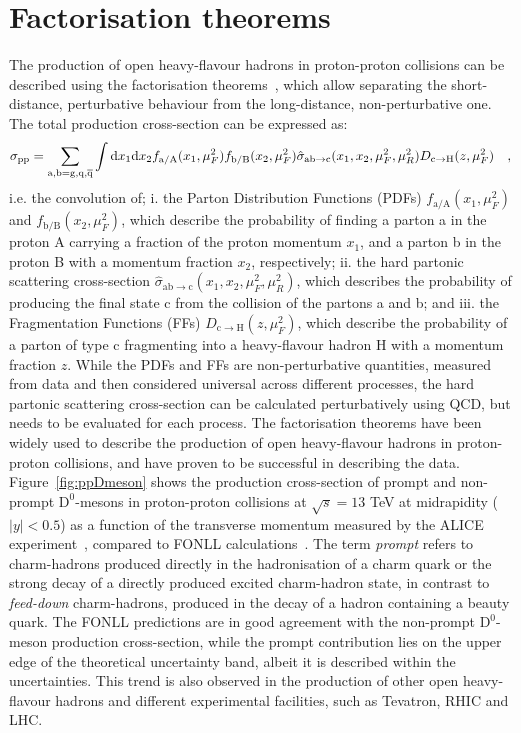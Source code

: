 \section{Factorisation theorems}
The production of open heavy-flavour hadrons in proton-proton collisions can be described using the factorisation theorems~\cite{Collins:1989gx}, which allow separating the short-distance, perturbative behaviour from the long-distance, non-perturbative one. The total production cross-section can be expressed as:
\begin{equation*}
    \sigma_{\text{pp}} = \sum_\mathrm{a,b = g, q, \overline{q}} \int \mathrm{d} x_1 \mathrm{d} x_2 f_\mathrm{a/A}(x_1,\mu_F^2) f_\mathrm{b/B}(x_2,\mu_F^2) \hat{\sigma}_\mathrm{ab \rightarrow c} (x_1,x_2,\mu_F^2,\mu_R^2) D_\mathrm{c\rightarrow H}(z,\mu_F^2) \quad ,
\end{equation*}
i.e. the convolution of; i. the Parton Distribution Functions (PDFs) $f_\mathrm{a/A}(x_1,\mu_F^2)$ and $f_\mathrm{b/B}(x_2,\mu_F^2)$, which describe the probability of finding a parton a in the proton A carrying a fraction of the proton momentum $x_1$, and a parton b in the proton B with a momentum fraction $x_2$, respectively; ii. the hard partonic scattering cross-section $\hat{\sigma}_\mathrm{ab \rightarrow c} (x_1,x_2,\mu_F^2,\mu_R^2)$, which describes the probability of producing the final state c from the collision of the partons a and b; and iii. the Fragmentation Functions (FFs) $D_\mathrm{c\rightarrow H}(z,\mu_F^2)$, which describe the probability of a parton of type c fragmenting into a heavy-flavour hadron H with a momentum fraction $z$. While the PDFs and FFs are non-perturbative quantities, measured from data and then considered universal across different processes, the hard partonic scattering cross-section can be calculated perturbatively using QCD, but needs to be evaluated for each process. The factorisation theorems have been widely used to describe the production of open heavy-flavour hadrons in proton-proton collisions, and have proven to be successful in describing the data. Figure~\ref{fig:ppDmeson} shows the production cross-section of prompt and non-prompt $\mathrm{D^0}$-mesons in proton-proton collisions at $\sqrt{s} = 13$ TeV at midrapidity ($\lvert y\rvert<0.5$) as a function of the transverse momentum \pt measured by the ALICE experiment~\cite{ALICE:2021mgk}, compared to FONLL calculations~\cite{Cacciari:2001td}. The term \emph{prompt} refers to charm-hadrons produced directly in the hadronisation of a charm quark or the strong decay of a directly produced excited charm-hadron state, in contrast to \emph{feed-down} charm-hadrons, produced in the decay of a hadron containing a beauty quark. The FONLL predictions are in good agreement with the non-prompt $\mathrm{D^0}$-meson production cross-section, while the prompt contribution lies on the upper edge of the theoretical uncertainty band, albeit it is described within the uncertainties. This trend is also observed in the production of other open heavy-flavour hadrons and different experimental facilities, such as Tevatron, RHIC and LHC.

